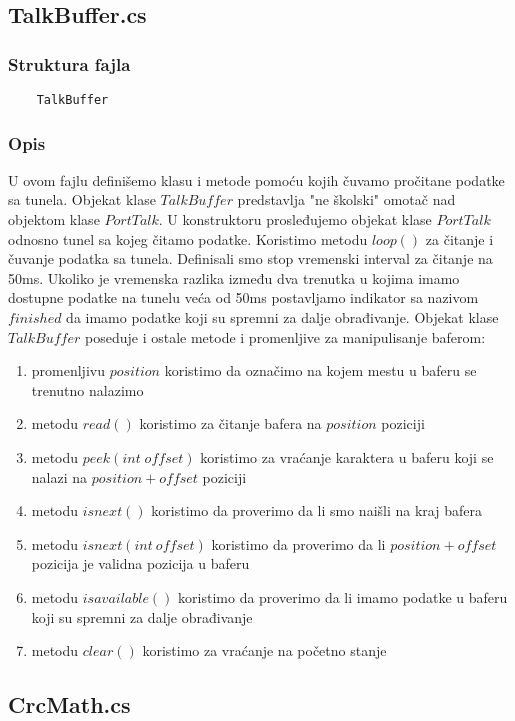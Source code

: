 \documentclass[a4paper]{extarticle}
\begin{document}
	\subsection{TalkBuffer.cs}
	\label{talkBufferSection}
		\subsubsection*{Struktura fajla}
	\begin{verbatim}
	TalkBuffer
	\end{verbatim}
	
	\subsubsection*{Opis}
	U ovom fajlu definišemo klasu i metode pomoću kojih čuvamo pročitane podatke sa tunela. Objekat klase $TalkBuffer$ predstavlja "ne školski" omotač nad objektom klase $PortTalk$. U konstruktoru prosleđujemo  objekat klase $PortTalk$ odnosno tunel sa kojeg čitamo podatke. 
	Koristimo metodu $loop()$ za čitanje i čuvanje podatka sa tunela. Definisali smo stop vremenski interval za čitanje na 50ms. Ukoliko je vremenska razlika između dva trenutka u kojima imamo dostupne podatke na tunelu veća od 50ms postavljamo indikator sa nazivom $finished$ da imamo podatke koji su spremni za dalje obrađivanje. Objekat klase $TalkBuffer$ poseduje i ostale metode i promenljive za manipulisanje baferom:
	\begin{enumerate}
		\item promenljivu $position$ koristimo da označimo na kojem mestu u baferu se trenutno nalazimo
		\item metodu $read()$ koristimo za čitanje bafera na $position$ poziciji
		\item metodu $peek(int \; offset)$ koristimo za vraćanje karaktera u baferu koji se nalazi na $position+offset$ poziciji
		\item metodu $isnext()$ koristimo da proverimo da li smo naišli na kraj bafera
		\item metodu $isnext(int \: offset)$ koristimo da proverimo da li $position+offset$ pozicija je validna pozicija u baferu
		\item metodu $isavailable()$ koristimo da proverimo da li imamo podatke u baferu koji su spremni za dalje obrađivanje
		\item metodu $clear()$ koristimo za vraćanje na početno stanje
	\end{enumerate}
	
	\subsection{CrcMath.cs}
	\label{a5}
\end{document}
